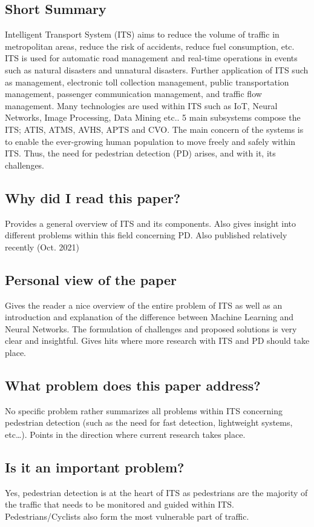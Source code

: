 \documentclass[11pt,a4paper]{article}
\begin{document}
\subsection*{Short Summary} 
Intelligent Transport System (ITS) aims to reduce the volume of traffic in metropolitan areas, reduce the risk of accidents, reduce fuel consumption, etc. ITS is used for automatic road management and real-time operations in events such as natural disasters and unnatural disasters. Further application of ITS such as management, electronic toll collection management, public transportation management, passenger communication management, and traffic flow management. Many technologies are used within ITS such as IoT, Neural Networks, Image Processing, Data Mining etc.. 5 main subsystems compose the ITS; ATIS, ATMS, AVHS, APTS and CVO. The main concern of the systems is to enable the ever-growing human population to move freely and safely within ITS. Thus, the need for pedestrian detection (PD) arises, and with it, its challenges.

\subsection*{Why did I read this paper?}
Provides a general overview of ITS and its components. Also gives insight into different problems within this field concerning PD. Also published relatively recently (Oct. 2021)

\subsection*{Personal view of the paper}
Gives the reader a nice overview of the entire problem of ITS as well as an introduction and explanation of the difference between Machine Learning and Neural Networks. The formulation of challenges and proposed solutions is very clear and insightful. Gives hits where more research with ITS and PD should take place.

\subsection*{What problem does this paper address?}
No specific problem rather summarizes all problems within ITS concerning pedestrian detection (such as the need for fast detection, lightweight systems, etc…). Points in the direction where current research takes place.

\subsection*{Is it an important problem?}
Yes, pedestrian detection is at the heart of ITS as pedestrians are the majority of the traffic that needs to be monitored and guided within ITS. Pedestrians/Cyclists also form the most vulnerable part of traffic.
\end{document}
